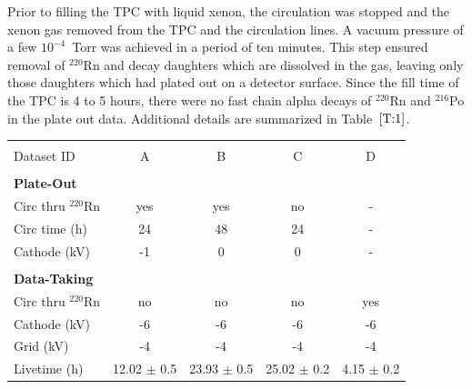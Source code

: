 Prior to filling the \ac{TPC} with liquid xenon, the circulation was stopped and the xenon gas removed from the \ac{TPC} and the circulation lines. A vacuum pressure of a few $10^{-4}$~Torr was achieved in a period of ten minutes. This step ensured removal of $^{220}$Rn and decay daughters which are dissolved in the gas, leaving only those daughters which had plated out on a detector surface. Since the fill time of the \ac{TPC} is 4 to 5 hours, there were no fast chain alpha decays of $^{220}$Rn and $^{216}$Po in the plate out data. Additional details are summarized in Table~$\ref{T:1}$.

\begin{table}[ht]
\centering
\begin{tabular}{lcccc}
\hline
\\[-5pt]
Dataset ID & A &B & C & D \\
\\[-5pt]
\hline

\textbf{Plate-Out} & & & & \\
Circ thru $^{220}$Rn  & yes & yes & no & - \\
Circ time  (h) & 24 & 48 & 24 & - \\
Cathode  (kV) & -1 & 0 & 0 &  - \\
\\[-5pt]

\textbf{Data-Taking} & & & & \\
Circ thru $^{220}$Rn  & no & no & no & yes\\
Cathode  (kV) & -6 & -6 & -6 & -6 \\
Grid  (kV) & -4 & -4 & -4 & -4 \\
Livetime (h) & 12.02 $\pm$ 0.5 & 23.93 $\pm$ 0.5 & 25.02 $\pm$ 0.2 & 4.15 $\pm$ 0.2  \\


\end{tabular}
\end{table}
